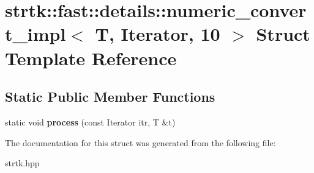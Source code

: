 \hypertarget{structstrtk_1_1fast_1_1details_1_1numeric__convert__impl_3_01T_00_01Iterator_00_0110_01_4}{\section{strtk\-:\-:fast\-:\-:details\-:\-:numeric\-\_\-convert\-\_\-impl$<$ T, Iterator, 10 $>$ Struct Template Reference}
\label{structstrtk_1_1fast_1_1details_1_1numeric__convert__impl_3_01T_00_01Iterator_00_0110_01_4}
}
\subsection*{Static Public Member Functions}
\begin{DoxyCompactItemize}
\item 
\hypertarget{structstrtk_1_1fast_1_1details_1_1numeric__convert__impl_3_01T_00_01Iterator_00_0110_01_4_ae784223edc6b4f28e273f945c88be19a}{static void {\bfseries process} (const Iterator itr, T \&t)}\label{structstrtk_1_1fast_1_1details_1_1numeric__convert__impl_3_01T_00_01Iterator_00_0110_01_4_ae784223edc6b4f28e273f945c88be19a}

\end{DoxyCompactItemize}


The documentation for this struct was generated from the following file\-:\begin{DoxyCompactItemize}
\item 
strtk.\-hpp\end{DoxyCompactItemize}
